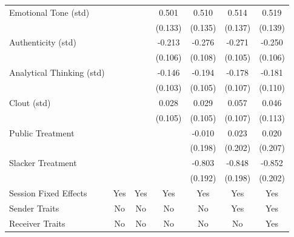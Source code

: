 \begin{tabular}{lcccccc}
Emotional Tone (std)&                  &                  &    0.501\sym{***}&    0.510\sym{***}&    0.514\sym{***}&    0.519\sym{***}\\
                &                  &                  &  (0.133)         &  (0.135)         &  (0.137)         &  (0.139)         \\
Authenticity (std)&                  &                  &   -0.213\sym{**} &   -0.276\sym{**} &   -0.271\sym{***}&   -0.250\sym{**} \\
                &                  &                  &  (0.106)         &  (0.108)         &  (0.105)         &  (0.106)         \\
Analytical Thinking (std)&                  &                  &   -0.146         &   -0.194\sym{*}  &   -0.178\sym{*}  &   -0.181\sym{*}  \\
                &                  &                  &  (0.103)         &  (0.105)         &  (0.107)         &  (0.110)         \\
Clout (std)     &                  &                  &    0.028         &    0.029         &    0.057         &    0.046         \\
                &                  &                  &  (0.105)         &  (0.105)         &  (0.107)         &  (0.113)         \\
Public Treatment&                  &                  &                  &   -0.010         &    0.023         &    0.020         \\
                &                  &                  &                  &  (0.198)         &  (0.202)         &  (0.207)         \\
Slacker Treatment&                  &                  &                  &   -0.803\sym{***}&   -0.848\sym{***}&   -0.852\sym{***}\\
                &                  &                  &                  &  (0.192)         &  (0.198)         &  (0.202)         \\
Session Fixed Effects &      Yes         &      Yes         &      Yes         &      Yes         &      Yes         &      Yes         \\
Sender Traits   &       No         &       No         &       No         &       No         &      Yes         &      Yes         \\
Receiver Traits &       No         &       No         &       No         &       No         &       No         &      Yes         \\

\end{tabular}
